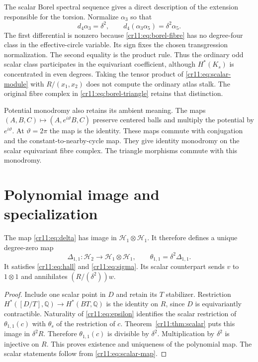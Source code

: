 The scalar Borel spectral sequence gives a direct description of the
extension responsible for the torsion.
Normalize $\alpha_3$ so that
\[
 d_4\alpha_3=\delta^2,\qquad
 d_4(\alpha_3\alpha_5)=\delta^2\alpha_5.
\]
The first differential is nonzero because
\eqref{cr11:eq:borel-fibre} has no degree-four class in the effective-circle
variable. Its sign fixes the chosen transgression normalization.
The second equality is the product rule.
Thus the ordinary odd scalar class participates in the equivariant
coefficient, although $H^*(K_s)$ is concentrated in even degrees.
Taking the tensor product of \eqref{cr11:eq:scalar-module} with
$R/(x_1,x_2)$ does not compute the ordinary atlas stalk.
The original fibre complex in \eqref{cr11:eq:borel-triangle} retains
that distinction.

Potential monodromy also retains its ambient meaning.
The maps $(A,B,C)\mapsto(A,e^{i\vartheta}B,C)$ preserve centered balls
and multiply the potential by $e^{i\vartheta}$.
At $\vartheta=2\pi$ the map is the identity.
These maps commute with conjugation and the constant-to-nearby-cycle map.
They give identity monodromy on the scalar equivariant fibre complex.
The triangle morphisms commute with this monodromy.

\section{Polynomial image and specialization}
\label{cr11:sec:polynomial}

\begin{corollary}
\label{cr11:cor:polynomial}
The map \eqref{cr11:eq:delta} has image in
$\mathcal H_1\otimes\mathcal H_1$.
It therefore defines a unique degree-zero map
\[
 \Delta_{1,1}:\mathcal H_2\longrightarrow\mathcal H_1\otimes\mathcal H_1,
 \qquad \theta_{1,1}=\delta^2\Delta_{1,1}.
\]
It satisfies \eqref{cr11:eq:hall} and \eqref{cr11:eq:sigma}.
Its scalar counterpart sends $v$ to $1\otimes1$ and annihilates
$(R/(\delta^2))w$.
\end{corollary}

\begin{proof}
Include one scalar point in $D$ and retain its $T$ stabilizer.
Restriction $H^*([D/T],\mathbb Q)\to H^*(BT,\mathbb Q)$ is the
identity on $R$, since $D$ is equivariantly contractible.
Naturality of \eqref{cr11:eq:epsilon} identifies the scalar restriction
of $\theta_{1,1}(c)$ with $\theta_s$ of the restriction of $c$.
Theorem~\ref{cr11:thm:scalar} puts this image in $\delta^2R$.
Therefore $\theta_{1,1}(c)$ is divisible by $\delta^2$.
Multiplication by $\delta^2$ is injective on $R$.
This proves existence and uniqueness of the polynomial map.
The scalar statements follow from \eqref{cr11:eq:scalar-map}.
\end{proof}

